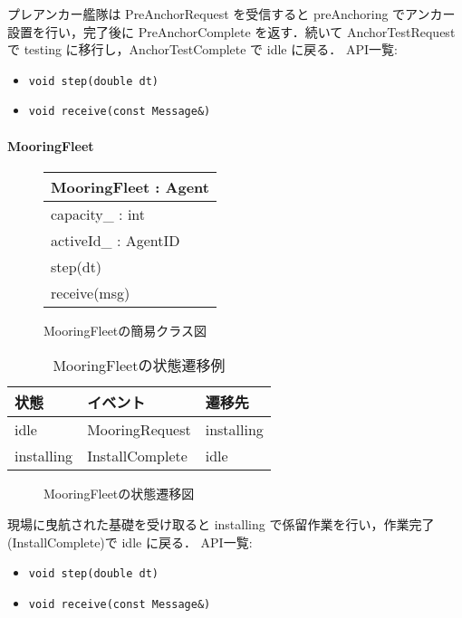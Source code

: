 \documentclass[10pt,letterpaper]{jsarticle}
\begin{document}
プレアンカー艦隊は PreAnchorRequest を受信すると preAnchoring でアンカー設置を行い，完了後に PreAnchorComplete を返す．続いて AnchorTestRequest で testing に移行し，AnchorTestComplete で idle に戻る．
API一覧:
\begin{itemize}
  \item \texttt{void step(double dt)}
  \item \texttt{void receive(const Message\&)}
\end{itemize}

\paragraph{MooringFleet}
\begin{figure}[htbp]
  \centering
  \begin{tabular}{|l|}
    \hline
    \textbf{MooringFleet} : Agent \\
    \hline
    capacity\_ : int \\
    activeId\_ : AgentID \\
    \hline
    step(dt) \\
    receive(msg) \\
    \hline
  \end{tabular}
  \caption{MooringFleetの簡易クラス図}
\end{figure}
\begin{table}[htbp]
  \centering
  \begin{tabular}{lll}
    \toprule
    状態 & イベント & 遷移先 \\
    \midrule
    idle & MooringRequest & installing \\
    installing & InstallComplete & idle \\
    \bottomrule
  \end{tabular}
  \caption{MooringFleetの状態遷移例}
\end{table}
\begin{figure}[htbp]
  \centering
  \caption{MooringFleetの状態遷移図}
\end{figure}
現場に曳航された基礎を受け取ると installing で係留作業を行い，作業完了(InstallComplete)で idle に戻る．
API一覧:
\begin{itemize}
  \item \texttt{void step(double dt)}
  \item \texttt{void receive(const Message\&)}
\end{itemize}
\end{document}
